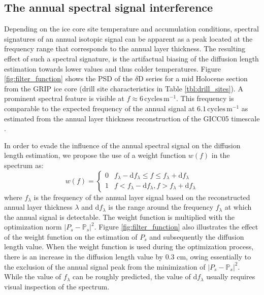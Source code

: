 \documentclass[11pt, draftcls, onecolumn]{IEEEtran} %
\numberwithin{equation}{section}
\numberwithin{table}{section}
\numberwithin{figure}{section}
\begin{document}
\subsection*{The annual spectral signal interference}
Depending on the ice core site temperature and accumulation conditions, spectral signatures of an annual isotopic signal can be apparent
as a peak located at the frequency range that corresponds to the annual layer thickness.
The resulting effect of such a spectral signature, is the artifactual biasing of the diffusion length estimation 
towards lower values and thus colder temperatures.
Figure \ref{fig:filter_function} shows the PSD of the $\delta$D series for a mid Holocene section from the GRIP ice core
(drill site characteristics in Table \ref{tbl:drill_sites}). 
A prominent spectral feature  is visible at  $f\approx6 \,\mathrm{cycles\,m^{-1}}$. This frequency is comparable to the 
expected frequency of the annual signal at $6.1\,\mathrm{cycles\,m^{-1}}$ as estimated from the annual layer thickness reconstruction 
of the GICC05 timescale \citep{Vinther2006}.


In order to evade the influence of the annual spectral signal on the diffusion length estimation, we propose the use of a weight 
function $w(f)$ in the spectrum as:
\begin{equation}\label{eq:weight_function}
w(f)= \left\{
\begin{array}{ll}
0 &  f_{\lambda} - \mathrm{d}f_{\lambda} \leq f \leq
f_{\lambda} + \mathrm{d}f_{\lambda}\\ 
1                           &    f<f_{\lambda} - \mathrm{d}f_{\lambda}, f>f_{\lambda} + \mathrm{d}f_{\lambda}
\end{array} \right. {}
\end{equation}
where $f_\lambda$ is the frequency of the annual layer signal based on the reconstructed 
annual layer thickness $\lambda$ and $\mathrm{d}f_{\lambda}$ is the range around the frequency $f_{\lambda}$
at which the annual signal is detectable.
The weight function is multiplied with the optimization norm $\vert P_s - \mathbb{P}_s \vert^2$.
Figure \ref{fig:filter_function} also illustrates the effect of the weight function on the estimation of $P_s$ and subsequently 
the diffusion length value. When the weight function is used during the optimization process, there is an increase in the
diffusion length value by 0.3 cm, owing essentially to the exclusion of the annual signal peak from the minimization 
of $\vert P_s - \mathbb{P}_s \vert^2$.
While the value of $f_{\lambda}$ can be roughly predicted, the value of $\mathrm{d}f_{\lambda}$ usually requires visual 
inspection of the spectrum. 
\end{document}
